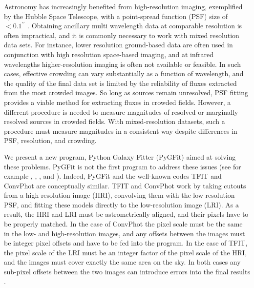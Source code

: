 \documentclass[apj]{emulateapj}
\newcommand{\pygfit}{PyGFit}
\newcommand{\tfit}{TFIT}
\newcommand{\convphot}{ConvPhot}
\begin{document}
Astronomy has increasingly benefited from high-resolution imaging, exemplified by the Hubble Space Telescope, with a point-spread function (PSF) size of $<0.1^{\prime\prime}$ \citep{wfc3handbook}.  Obtaining ancillary multi wavelength data at comparable resolution is often impractical, and it is commonly necessary to work with mixed resolution data sets.  For instance, lower resolution ground-based data are often used in conjunction with high resolution space-based imaging, and at infrared wavelengths higher-resolution imaging is often not available or feasible.  In such cases, effective crowding can vary substantially as a function of wavelength, and the quality of the final data set is limited by the reliability of fluxes extracted from the most crowded images.  So long as sources remain unresolved, PSF fitting provides a viable method for extracting fluxes in crowded fields.  However, a different procedure is needed to measure magnitudes of resolved or marginally-resolved sources in crowded fields.  With mixed-resolution datasets, such a procedure must measure magnitudes in a consistent way despite differences in PSF, resolution, and crowding.

We present a new program, Python Galaxy Fitter (\pygfit{}) aimed at solving these problems.  \pygfit{} is not the first program to address these issues (see for example \citealt{soto99}, \citealt{labbe05}, \citealt{tfit}, and \citealt{desantis07}).  Indeed, \pygfit{} and the well-known codes \tfit{} \citep{tfit} and \convphot{} \citep{desantis07} are conceptually similar.  \tfit{} and \convphot{} work by taking cutouts from a high-resolution image (HRI), convolving them with the low-resolution PSF, and fitting these models directly to the low-resolution image (LRI).  As a result, the HRI and LRI must be astrometrically aligned, and their pixels have to be properly matched.  In the case of \convphot{} the pixel scale must be the same in the low- and high-resolution images, and any offsets between the images must be integer pixel offsets and have to be fed into the program.  In the case of \tfit{}, the pixel scale of the LRI must be an integer factor of the pixel scale of the HRI, and the images must cover exactly the same area on the sky.  In both cases any sub-pixel offsets between the two images can introduce errors into the final results \citep{tfit}.
\end{document}

